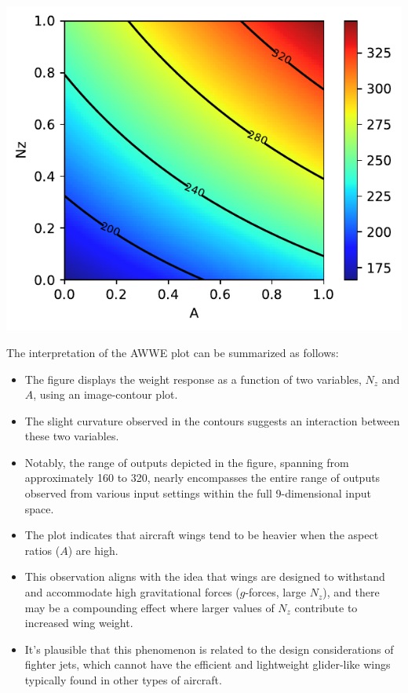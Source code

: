 \documentclass[
  letterpaper,
  DIV=11,
  numbers=noendperiod]{scrreprt}
\providecommand{\tightlist}{%
  \setlength{\itemsep}{0pt}\setlength{\parskip}{0pt}}\usepackage{longtable,booktabs,array}
\begin{document}
\includegraphics{002_awwe_files/figure-pdf/cell-6-output-1.pdf}

The interpretation of the AWWE plot can be summarized as follows:

\begin{itemize}
\tightlist
\item
  The figure displays the weight response as a function of two
  variables, \(N_z\) and \(A\), using an image-contour plot.
\item
  The slight curvature observed in the contours suggests an interaction
  between these two variables.
\item
  Notably, the range of outputs depicted in the figure, spanning from
  approximately 160 to 320, nearly encompasses the entire range of
  outputs observed from various input settings within the full
  9-dimensional input space.
\item
  The plot indicates that aircraft wings tend to be heavier when the
  aspect ratios (\(A\)) are high.
\item
  This observation aligns with the idea that wings are designed to
  withstand and accommodate high gravitational forces (\(g\)-forces,
  large \(N_z\)), and there may be a compounding effect where larger
  values of \(N_z\) contribute to increased wing weight.
\item
  It's plausible that this phenomenon is related to the design
  considerations of fighter jets, which cannot have the efficient and
  lightweight glider-like wings typically found in other types of
  aircraft.
\end{itemize}
\end{document}
